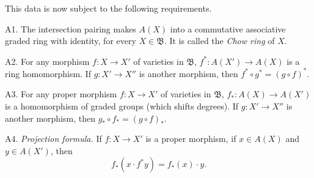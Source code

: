 {This data is now subject to the following requirements.

\hypertarget{axiom-A-A1}{}A1. The intersection pairing makes $A(X)$ into a commutative associative graded ring with identity, for every $X\in\mathfrak B$. It is called the \emph{Chow ring} of $X$.

\hypertarget{axiom-A-A2}{}A2. For any morphism $f\colon X\to X'$ of varieties in $\mathfrak B$, $f^*\colon A(X')\to A(X)$ is a ring homomorphism. If $g\colon X'\to X''$ is another morphism, then $f^*\circ g^*=(g\circ f)^*$.

\hypertarget{axiom-A-A3}{}A3. For any proper morphism $f\colon X\to X'$ of varieties in $\mathfrak B$, $f_*\colon A(X)\to A(X')$ is a homomorphism of graded groups (which shifts degrees). If $g\colon X'\to X''$ is another morphism, then $g_*\circ f_*=(g\circ f)_*$.

\hypertarget{axiom-A-A4}{}A4. \emph{Projection formula.} If $f\colon X\to X'$ is a proper morphism, if $x\in A(X)$ and $y\in A(X')$, then
\[
f_*(x\cdot f^*y)=f_*(x)\cdot y.
\]
}

